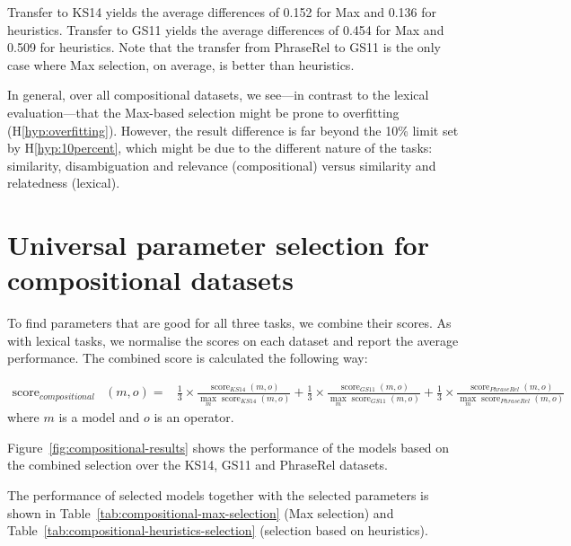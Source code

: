 Transfer to KS14 yields the average differences of 0.152 for Max and 0.136 for heuristics. Transfer to GS11 yields the average differences of 0.454 for Max and 0.509 for heuristics. Note that the transfer from PhraseRel to GS11 is the only case where Max selection, on average, is better than heuristics.

In general, over all compositional datasets, we see---in contrast to the lexical evaluation---that the Max-based selection might be prone to overfitting (H\ref{hyp:overfitting}). However, the result difference is far beyond the 10\% limit set by H\ref{hyp:10percent}, which might be due to the different nature of the tasks: similarity, disambiguation and relevance (compositional) versus similarity and relatedness (lexical).

\section{Universal parameter selection for compositional datasets}
\label{sec:robust-param-comp-selecion}

To find parameters that are good for all three tasks, we combine their scores. As with lexical tasks, we normalise the scores on each dataset and report the average performance. The combined score is calculated the following way:

{
\scriptsize
\begin{align}
\operatorname{score}_\mathit{compositional}&(\mathit{m}, \mathit{o}) =
&\frac{1}{3}\times%
\frac{\operatorname{score}_\mathit{KS14}(\mathit{m}, \mathit{o})}%
{\max_m\operatorname{score}_\mathit{KS14}(m, \mathit{o})}%
+%
\frac{1}{3}\times%
\frac{\operatorname{score}_\mathit{GS11}(\mathit{m}, \mathit{o})}%
{\max_m\operatorname{score}_\mathit{GS11}(m, \mathit{o})}%
+%
\frac{1}{3}\times%
\frac{\operatorname{score}_\mathit{PhraseRel}(\mathit{m, \mathit{o}})}%
{\max_m\operatorname{score}_\mathit{PhraseRel}(m, \mathit{o})}%
\end{align}
}
where $m$ is a model and $o$ is an operator.

Figure~\ref{fig:compositional-results} shows the performance of the models based on the combined selection over the KS14, GS11 and PhraseRel datasets. 

The performance of selected models together with the selected parameters is shown in Table~\ref{tab:compositional-max-selection} (Max selection) and Table~\ref{tab:compositional-heuristics-selection} (selection based on heuristics).

